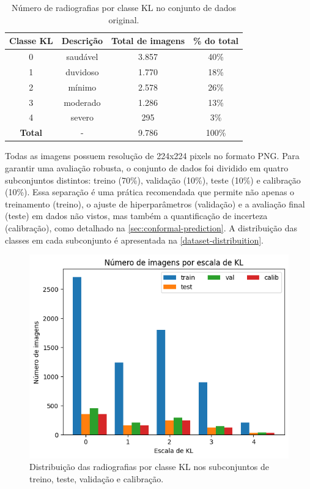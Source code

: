 \begin{table}[ht]
    \centering
    \begin{tabular}{|c|c|c|c|}
        \hline
        \textbf{Classe KL} & \textbf{Descrição} & \textbf{Total de imagens} & \textbf{\% do total} \\
        \hline
        0 & saudável & 3.857 & 40\% \\
        1 & duvidoso & 1.770 & 18\% \\
        2 & mínimo & 2.578 & 26\% \\
        3 & moderado & 1.286 & 13\% \\
        4 & severo & 295 & 3\% \\
        \hline
        \textbf{Total} & - & 9.786 & 100\% \\
        \hline
    \end{tabular}
    \caption{Número de radiografias por classe KL no conjunto de dados original.}
    \label{dataset-summary}
\end{table}

Todas as imagens possuem resolução de 224x224 pixels no formato PNG. Para garantir uma avaliação robusta, o conjunto de dados foi dividido em quatro subconjuntos distintos: treino (70\%), validação (10\%), teste (10\%) e calibração (10\%). Essa separação é uma prática recomendada que permite não apenas o treinamento (treino), o ajuste de hiperparâmetros (validação) e a avaliação final (teste) em dados não vistos, mas também a quantificação de incerteza (calibração), como detalhado na \autoref{sec:conformal-prediction}. A distribuição das classes em cada subconjunto é apresentada na \autoref{dataset-distribuition}.

\begin{figure}[ht]
    \centering
    \includegraphics[width=0.7\linewidth]{figs/dataset-class-distribution.png}
    \caption{Distribuição das radiografias por classe KL nos subconjuntos de treino, teste, validação e calibração.}
    \label{dataset-distribuition}
\end{figure}

